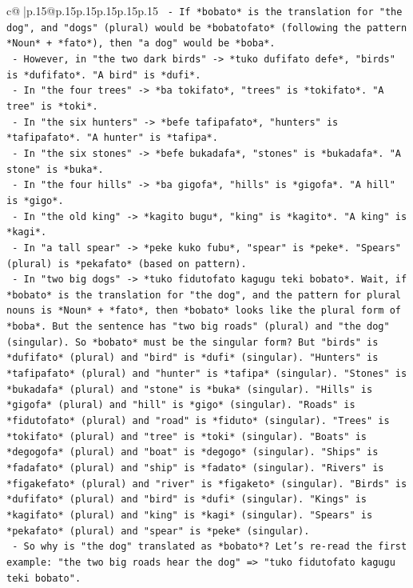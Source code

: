 \documentclass{article}
\begin{document}
{\begin{supertabular}{c@{$\;$}|p{.15\linewidth}@{}p{.15\linewidth}p{.15\linewidth}p{.15\linewidth}p{.15\linewidth}p{.15\linewidth}}
{{{\texttt{    {-} If *bobato* is the translation for "the dog", and "dogs" (plural) would be *bobatofato* (following the pattern *Noun* + *fato*), then "a dog" would be *boba*.} \\
\texttt{    {-} However, in "the two dark birds" {-}> *tuko dufifato defe*, "birds" is *dufifato*. "A bird" is *dufi*.} \\
\texttt{    {-} In "the four trees" {-}> *ba tokifato*, "trees" is *tokifato*. "A tree" is *toki*.} \\
\texttt{    {-} In "the six hunters" {-}> *befe tafipafato*, "hunters" is *tafipafato*. "A hunter" is *tafipa*.} \\
\texttt{    {-} In "the six stones" {-}> *befe bukadafa*, "stones" is *bukadafa*. "A stone" is *buka*.} \\
\texttt{    {-} In "the four hills" {-}> *ba gigofa*, "hills" is *gigofa*. "A hill" is *gigo*.} \\
\texttt{    {-} In "the old king" {-}> *kagito bugu*, "king" is *kagito*. "A king" is *kagi*.} \\
\texttt{    {-} In "a tall spear" {-}> *peke kuko fubu*, "spear" is *peke*. "Spears" (plural) is *pekafato* (based on pattern).} \\
\texttt{    {-} In "two big dogs" {-}> *tuko fidutofato kagugu teki bobato*. Wait, if *bobato* is the translation for "the dog", and the pattern for plural nouns is *Noun* + *fato*, then *bobato* looks like the plural form of *boba*. But the sentence has "two big roads" (plural) and "the dog" (singular). So *bobato* must be the singular form? But "birds" is *dufifato* (plural) and "bird" is *dufi* (singular). "Hunters" is *tafipafato* (plural) and "hunter" is *tafipa* (singular). "Stones" is *bukadafa* (plural) and "stone" is *buka* (singular). "Hills" is *gigofa* (plural) and "hill" is *gigo* (singular). "Roads" is *fidutofato* (plural) and "road" is *fiduto* (singular). "Trees" is *tokifato* (plural) and "tree" is *toki* (singular). "Boats" is *degogofa* (plural) and "boat" is *degogo* (singular). "Ships" is *fadafato* (plural) and "ship" is *fadato* (singular). "Rivers" is *figakefato* (plural) and "river" is *figaketo* (singular). "Birds" is *dufifato* (plural) and "bird" is *dufi* (singular). "Kings" is *kagifato* (plural) and "king" is *kagi* (singular). "Spears" is *pekafato* (plural) and "spear" is *peke* (singular).} \\
\texttt{    {-} So why is "the dog" translated as *bobato*? Let's re{-}read the first example: "the two big roads hear the dog" => "tuko fidutofato kagugu teki bobato".} \\
}}}
\end{supertabular}}
\end{document}
